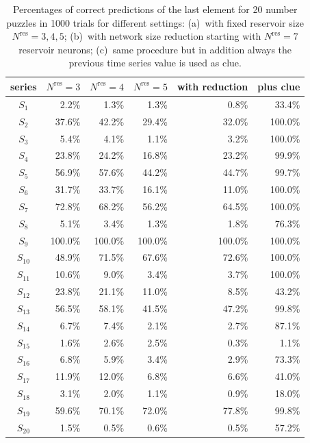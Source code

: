\documentclass[preprint,12pt,times,authoryear]{elsarticle}%
\theoremstyle{definition}
\newcommand{\head}[1]{\multicolumn{1}{c}{#1}}
\begin{document}
\begin{table}[t]
  \centering\footnotesize
  \begin{tabular}{crrrrr}
	\toprule
 	\head{series} & \head{$N^\mathrm{res}=3$}& \head{$N^\mathrm{res}=4$} & \head{$N^\mathrm{res}=5$} & \head{with reduction} & \head{plus clue}\\ \midrule
	$S_{1}$ & 2.2\% & 1.3\% & 1.3\% & 0.8\% & 33.4\% \\
	$S_{2}$ & 37.6\% & 42.2\% & 29.4\% & 32.0\% & 100.0\% \\
	$S_{3}$ & 5.4\% & 4.1\% & 1.1\% & 3.2\% & 100.0\% \\
	$S_{4}$ & 23.8\% & 24.2\% & 16.8\% & 23.2\% & 99.9\% \\
	$S_{5}$ & 56.9\% & 57.6\% & 44.2\% & 44.7\% & 99.7\% \\
	$S_{6}$ & 31.7\% & 33.7\% & 16.1\% & 11.0\% & 100.0\% \\
	$S_{7}$ & 72.8\% & 68.2\% & 56.2\% & 64.5\% & 100.0\% \\
	$S_{8}$ & 5.1\% & 3.4\% & 1.3\% & 1.8\% & 76.3\% \\
	$S_{9}$ & 100.0\% & 100.0\% & 100.0\% & 100.0\% & 100.0\% \\
	$S_{10}$ & 48.9\% & 71.5\% & 67.6\% & 72.6\% & 100.0\% \\
	$S_{11}$ & 10.6\% & 9.0\% & 3.4\% & 3.7\% & 100.0\% \\
	$S_{12}$ & 23.8\% & 21.1\% & 11.0\% & 8.5\% & 43.2\% \\
	$S_{13}$ & 56.5\% & 58.1\% & 41.5\% & 47.2\% & 99.8\% \\
	$S_{14}$ & 6.7\% & 7.4\% & 2.1\% & 2.7\% & 87.1\% \\
	$S_{15}$ & 1.6\% & 2.6\% & 2.5\% & 0.3\% & 1.1\% \\
	$S_{16}$ & 6.8\% & 5.9\% & 3.4\% & 2.9\% & 73.3\% \\
	$S_{17}$ & 11.9\% & 12.0\% & 6.8\% & 6.6\% & 41.0\% \\
	$S_{18}$ & 3.1\% & 2.0\% & 1.1\% & 0.9\% & 18.0\% \\
	$S_{19}$ & 59.6\% & 70.1\% & 72.0\% & 77.8\% & 99.8\% \\
	$S_{20}$ & 1.5\% & 0.5\% & 0.6\% & 0.5\% & 57.2\% \\ \bottomrule
  \end{tabular}
  \caption{Percentages of correct predictions of the last element for 20 number
	puzzles \citep{RK11,GW13} in 1000 trials for different settings:
	(a)~with fixed reservoir size $N^\mathrm{res}=3,4,5$; (b)~with network size
	reduction starting with $N^\mathrm{res}=7$ reservoir neurons; (c)~same
	procedure but in addition always the previous time series value is used as clue.}
  \label{table}
\end{table}
\end{document}
